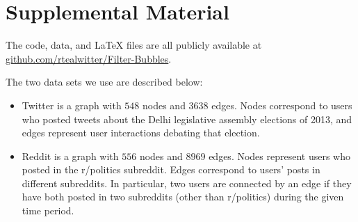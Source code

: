 \section{Supplemental Material}

The code, data, and LaTeX files are all publicly
available at \href{https://github.com/rtealwitter/Filter-Bubbles}
{github.com/rtealwitter/Filter-Bubbles}.

The two data sets we use are described below:
\begin{itemize}
    \item Twitter is a graph with $548$ nodes and $3638$ edges. Nodes correspond to users who posted tweets about the Delhi legislative assembly elections of 2013, and edges represent user interactions debating that election. 
    \item Reddit is a graph with $556$ nodes and $8969$ edges. Nodes represent users who posted in the r/politics subreddit. Edges correspond to users' posts in different subreddits. In particular, two users are connected by an edge if they have both posted in two subreddits (other than r/politics) during the given time period.
\end{itemize}